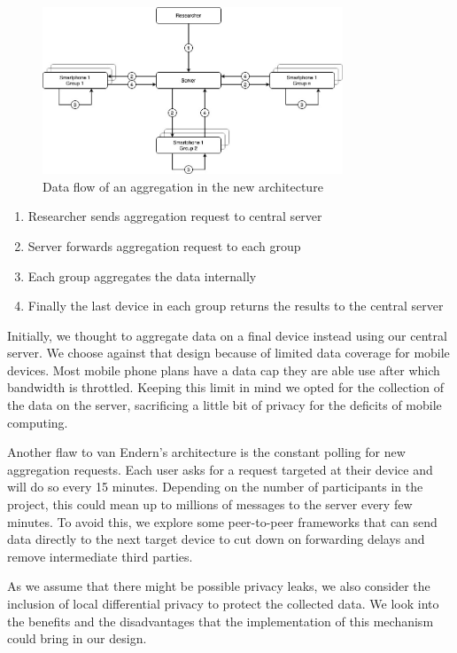 \begin{figure}[htbp]
  \centering
  \includegraphics[width=0.8\textwidth]{figures/ar}
  \caption{Data flow of an aggregation in the new architecture} \label{fig:ar}
\end{figure}

\begin{enumerate}
	\item Researcher sends aggregation request to central server
	\item Server forwards aggregation request to each group
	\item Each group aggregates the data internally
	\item Finally the last device in each group returns the results to the central server
\end{enumerate}

Initially, we thought to aggregate data on a final device instead using our central server. We choose against that design because of limited data coverage for mobile devices. Most mobile phone plans have a data cap they are able use after which bandwidth is throttled. Keeping this limit in mind we opted for the collection of the data on the server, sacrificing a little bit of privacy for the deficits of mobile computing.

Another flaw to van Endern's architecture is the constant polling for new aggregation requests. Each user asks for a request targeted at their device and will do so every 15 minutes. Depending on the number of participants in the project, this could mean up to millions of messages to the server every few minutes. To avoid this, we explore some peer-to-peer frameworks that can send data directly to the next target device to cut down on forwarding delays and remove intermediate third parties.

As we assume that there might be possible privacy leaks, we also consider the inclusion of local differential privacy to protect the collected data. We look into the benefits and the disadvantages that the implementation of this mechanism could bring in our design.

